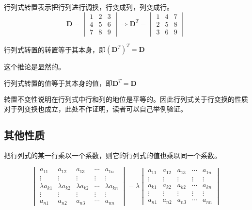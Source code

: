 行列式转置表示把行列进行调换，行变成列，列变成行。$$\mathbf{D} = \begin{vmatrix}
	1 & 2 & 3\\
	4 & 5 & 6\\
	7 & 8 & 9
\end{vmatrix} \Longrightarrow \mathbf{D}^{T}=\begin{vmatrix}
	1 & 4 & 7\\
	2 & 5 & 8\\
	3 & 6 & 9
\end{vmatrix}$$

\begin{corollary}
	行列式转置的转置等于其本身，即$\left( \mathbf{D}^{T} \right)^{T}=\mathbf{D}$
\end{corollary}

这个推论是显然的。

\begin{corollary}
	行列式转置的值等于其本身的值，即$\mathbf{D}^{T}=\mathbf{D}$
\end{corollary}

转置不变性说明在行列式中行和列的地位是平等的。因此行列式关于行变换的性质对于列变换也成立，此处不作证明，读者可以自己举例验证。

\subsection{其他性质}

\begin{corollary}
	把行列式的某一行乘以一个系数，则它的行列式的值也乘以同一个系数。
\end{corollary}

$$\begin{vmatrix}
	a_{11} & a_{12} & a_{13} & \cdots & a_{1n}\\
	\vdots & \vdots & \vdots & \vdots & \vdots\\
	\lambda a_{k1} & \lambda a_{k2} & \lambda a_{k2} & \cdots & \lambda a_{kn}\\
	\vdots & \vdots & \vdots & \vdots & \vdots\\
	a_{n1} & a_{n2} & a_{n3} & \cdots & a_{nn}
\end{vmatrix}=\lambda \begin{vmatrix}
	a_{11} & a_{12} & a_{13} & \cdots & a_{1n}\\
	\vdots & \vdots & \vdots & \vdots & \vdots\\
	a_{k1} & a_{k2} & a_{k2} & \cdots & a_{kn}\\
	\vdots & \vdots & \vdots & \vdots & \vdots\\
	a_{n1} & a_{n2} & a_{n3} & \cdots & a_{nn}
\end{vmatrix}$$

